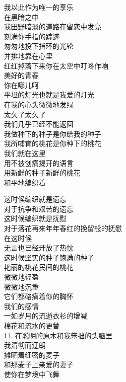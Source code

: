 \documentclass{article}
\begin{document}
我以此作为唯一的享乐\\
在黑暗之中\\
我田野暗淡的道路在留恋中发亮\\
刻满你手指的踪迹\\
匆匆地投下指环的光轮\\
并排地靠在心里
\\
红红掉落下来你在太空中叮咚作响 \\ 


美好的青春\\
你在哪儿呵\\
平坦的灯光也就是我爱的灯光
\\
在我的心头微微地发绿 \\ 


太久了太久了\\
我们几乎已经不能返回\\
我做种下的种子是你给我的种子\\
我所哺育的桃花是你种下的桃花\\
我们就在这里\\
用不被创痛揭开的语言\\
用新鲜的种子新鲜的桃花\\
和平地编织着\\
\newpage

这时候编织就是遗忘\\
对于抗争和艰苦的遗忘\\
这时候编织就是抚慰\\
对于落花再来年年春红的挽留般的抚慰\\
在这时候
\\
无言也已经开放了热忱 \\ 


这时候坚实的种子饱满的种子\\
艳丽的桃花民间的桃花\\
微微地轻盈\\
微微地沉重\\
它们都硌痛着你的胸怀\\
我们的感情\\
一如岁月的流逝衣衫的增减
\\
棉花和流水的更替 \\ 


11. 在聪明的原木和我笨拙的头脑里\\
我清彻而辽朗\\
摊晒着细密的麦子\\
和那麦子上亲爱的妻子\\
使你在梦境中飞舞\\
\newpage
\end{document}
